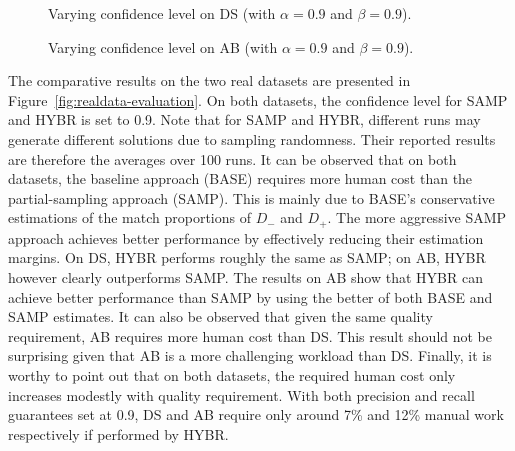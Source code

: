 \begin{figure}
\setlength{\abovecaptionskip}{\figcaptionspace}
\begin{minipage}[t]{0.5\textwidth}
\centering
{}
\caption{Varying confidence level on DS (with $\alpha=0.9$ and $\beta=0.9$).}
\label{fig:ds-confidence}
\vspace{0.4cm}
\end{minipage}

\begin{minipage}[t]{0.5\textwidth}
\centering
{}
\caption{Varying confidence level on AB (with $\alpha=0.9$ and $\beta=0.9$).}
\label{fig:ab-confidence}
\end{minipage}
\vspace{-0.55cm}
\end{figure}

  The comparative results on the two real datasets are presented in Figure~\ref{fig:realdata-evaluation}. On both datasets,  the confidence level for SAMP and HYBR is set to 0.9. Note that for SAMP and HYBR, different runs may generate different solutions due to sampling randomness. Their reported results are therefore the averages over 100 runs. It can be observed that on both datasets, the baseline approach (BASE) requires more human cost than the partial-sampling approach (SAMP). This is mainly due to BASE's conservative estimations of the match proportions of $D_-$ and $D_+$. The more aggressive SAMP approach achieves better performance by effectively reducing their estimation margins. On DS, HYBR performs roughly the same as SAMP; on AB, HYBR however clearly outperforms SAMP. The results on AB show that HYBR can achieve better performance than SAMP by using the better of both BASE and SAMP estimates. It can also be observed that given the same quality requirement, AB requires more human cost than DS. This result should not be surprising given that AB is a more challenging workload than DS. Finally, it is worthy to point out that on both datasets, the required human cost only increases modestly with quality requirement. With both precision and recall guarantees set at 0.9, DS and AB require only around 7\% and 12\% manual work respectively if performed by HYBR.

